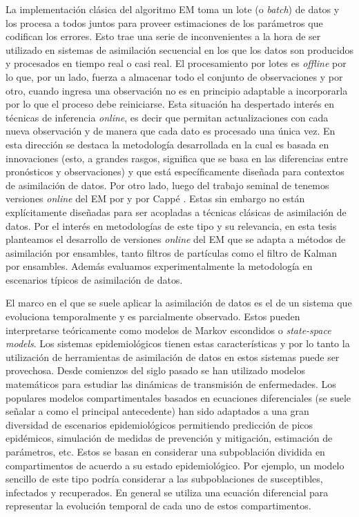 La implementación clásica del algoritmo EM toma un lote (o \textit{batch}) de datos y los procesa a todos juntos para proveer estimaciones de los parámetros que codifican los errores. Esto trae una serie de inconvenientes a la hora de ser utilizado en sistemas de asimilación secuencial en los que los datos son producidos y procesados en tiempo real o casi real. El procesamiento por lotes es \textit{offline} por lo que, por un lado, fuerza a almacenar todo el conjunto de observaciones y por otro, cuando ingresa una observación no es en principio adaptable a incorporarla por lo que el proceso debe reiniciarse. Esta situación ha despertado interés en técnicas de inferencia \textit{online}, es decir que permitan actualizaciones con cada nueva observación y de manera que cada dato es procesado una única vez. En esta dirección se destaca la metodología desarrollada en \cite{Berry2013} la cual es basada en innovaciones (esto, a grandes rasgos, significa que se basa en las diferencias entre pronósticos y observaciones) y que está específicamente diseñada para contextos de asimilación de datos. Por otro lado, luego del trabajo seminal de \cite{Neal1998} tenemos versiones \textit{online} del EM por \cite{Andrieu2003} y por Cappé \citep{Cappe2009,Cappe2011}. Estas sin embargo no están explícitamente diseñadas para ser acopladas a técnicas clásicas de asimilación de datos. Por el interés en metodologías de este tipo y su relevancia, en esta tesis planteamos el desarrollo de versiones \textit{online} del EM que se adapta a métodos de asimilación por ensambles, tanto filtros de partículas como el filtro de Kalman por ensambles. Además evaluamos experimentalmente la metodología en escenarios típicos de asimilación de datos.

El marco en el que se suele aplicar la asimilación de datos es el de un sistema que evoluciona temporalmente y es parcialmente observado. Estos pueden interpretarse teóricamente como modelos de Markov escondidos o \textit{state-space models}. Los sistemas epidemiológicos tienen estas características y por lo tanto la utilización de herramientas de asimilación de datos en estos sistemas puede ser provechosa. Desde comienzos del siglo pasado se han utilizado modelos matemáticos para estudiar las dinámicas de transmisión de enfermedades. Los populares modelos compartimentales basados en ecuaciones diferenciales (se suele señalar a \cite{Kermack1927} como el principal antecedente) han sido adaptados a una gran diversidad de escenarios epidemiológicos permitiendo predicción de picos epidémicos, simulación de medidas de prevención y mitigación, estimación de parámetros, etc. Estos se basan en considerar una subpoblación dividida en compartimentos de acuerdo a su estado epidemiológico. Por ejemplo, un modelo sencillo de este tipo podría considerar a las subpoblaciones de susceptibles, infectados y recuperados. En general se utiliza una ecuación diferencial para representar la evolución temporal de cada uno de estos compartimentos.

